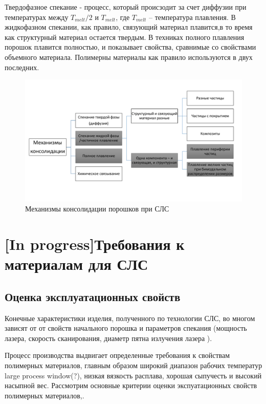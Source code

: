 Твердофазное спекание - процесс, который происзодит за счет диффузии при температурах между $T_{melt}/2$ и $T_{melt}$, где $T_{melt}$ -- температура плавления. В жидкофазном спекании, как правило, связующий материал  плавится,в то время как структурный материал остается твердым. В техниках полного плавления порошок плавится полностью, и показывает свойства, сравнимые со свойствами объемного материала. Полимерны материалы как правило используются в двух последних.



\begin{figure}[h]
    \centering
    \includegraphics[width = \linewidth]{fig/mecha.pdf}
    \caption{Механизмы консолидации порошков при СЛС}
    \label{fig:binding}
\end{figure}

\section{[In progress]Требования к материалам для СЛС}

\subsection{Оценка эксплуатационных свойств}
Конечные характеристики изделия, полученного по технологии СЛС, во многом зависят от от свойств начального порошка  и параметров спекания (мощность лазера, скорость сканирования, диаметр пятна излучения лазера ).

Процесс производства выдвигает определенные требования к свойствам полимерных материалов, главным образом широкий диапазон рабочих температур large process window(?), низкая вязкость расплава, хорошая сыпучесть и высокий насыпной вес.
Рассмотрим основные критерии оценки экспуатационных свойств полимерных материалов,\cite{termopols}.



